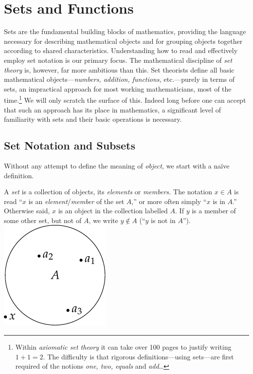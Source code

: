 \graphicspath{{4sets/asy/}}
\section{Sets and Functions}\label{chap:sets}


Sets are the fundamental building blocks of mathematics, providing the language necessary for describing mathematical objects and for grouping objects together according to shared characteristics. Understanding how to read and effectively employ set notation is our primary focus. The mathematical discipline of \emph{set theory} is, however, far more ambitious than this. Set theorists define all basic mathematical objects---\emph{numbers, addition, functions,} etc.---purely in terms of sets, an impractical approach for most working mathematicians, most of the time.\footnote{Within \emph{axiomatic set theory} it can take over 100 pages to justify writing $1+1=2$. The difficulty is that rigorous definitions---using sets---are first required of the notions \emph{one, two, equals} and \emph{add}\ldots} We will only scratch the surface of this. Indeed long before one can accept that such an approach has its place in mathematics, a significant level of familiarity with sets and their basic operations is necessary.


\subsection{Set Notation and Subsets}\label{sec:subset}

Without any attempt to define the meaning of \emph{object,} we start with a naïve definition.

\begin{defn}[lower separated=false, sidebyside, sidebyside align=top seam, sidebyside gap=0pt, righthand width=0.3\linewidth]{}{}
	A \emph{set} is a collection of objects, its \emph{elements} or \emph{members.}\smallbreak
	The notation $x\in A$ is read ``$x$ is an \emph{element}/\emph{member} of the set $A$,'' or more often simply ``$x$ is in $A$.'' Otherwise said, $x$ is an object in the collection labelled $A$.\smallbreak
	If $y$ is a member of some other set, but not of $A$, we write $y\notin A$ (``$y$ is not in $A$'').\smallbreak
	\tcblower
	\flushright\includegraphics{sets-01-venn}
\end{defn}

